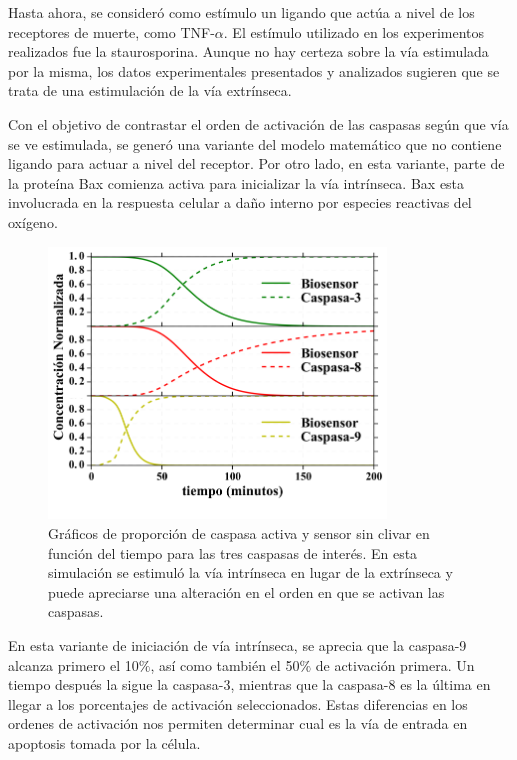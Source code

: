 Hasta ahora, se consideró como estímulo un ligando que actúa a nivel de los receptores de muerte, como TNF-$\alpha$. El estímulo utilizado en los experimentos realizados fue la staurosporina. Aunque no hay certeza sobre la vía estimulada por la misma, los datos experimentales presentados y analizados sugieren que se trata de una estimulación de la vía extrínseca.

Con el objetivo de contrastar el orden de activación de las caspasas según que vía se ve estimulada, se generó una variante del modelo matemático que no contiene ligando para actuar a nivel del receptor. Por otro lado, en esta variante, parte de la proteína Bax comienza activa para inicializar la vía intrínseca. Bax esta involucrada en la respuesta celular a daño interno por especies reactivas del oxígeno.

\begin{figure}
    \centering
    \includegraphics[width=0.8\textwidth]{./img/Cap4/IntAct.png}
    \caption{Gráficos de proporción de caspasa activa y sensor sin clivar en función del tiempo para las tres caspasas de interés. En esta simulación se estimuló la vía intrínseca en lugar de la extrínseca y puede apreciarse una alteración en el orden en que se activan las caspasas.}
    \label{fig:IntAct}
\end{figure}

En esta variante de iniciación de vía intrínseca, se aprecia que la caspasa-9 alcanza primero el 10$\%$, así como también el 50$\%$ de activación primera. Un tiempo después la sigue la caspasa-3, mientras que la caspasa-8 es la última en llegar a los porcentajes de activación seleccionados. Estas diferencias en los ordenes de activación nos permiten determinar cual es la vía de entrada en apoptosis tomada por la célula.